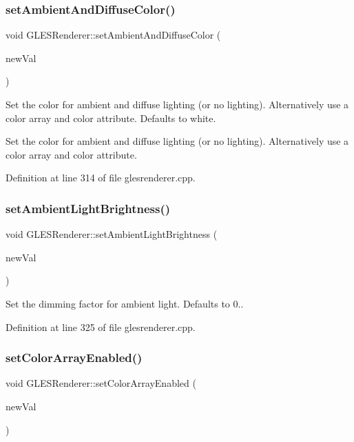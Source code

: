 \subsubsection{\texorpdfstring{setAmbientAndDiffuseColor()}{setAmbientAndDiffuseColor()}}
{\footnotesize\ttfamily void G\+L\+E\+S\+Renderer\+::set\+Ambient\+And\+Diffuse\+Color (\begin{DoxyParamCaption}\item[{const \mbox{\hyperlink{class_g_l_color_rgba}{G\+L\+Color\+Rgba}}}]{new\+Val }\end{DoxyParamCaption})}

Set the color for ambient and diffuse lighting (or no lighting). Alternatively use a color array and color attribute. Defaults to white.

Set the color for ambient and diffuse lighting (or no lighting). Alternatively use a color array and color attribute. 

Definition at line 314 of file glesrenderer.\+cpp.

\mbox{\label{class_g_l_e_s_renderer_a0173737627f25d5a0586a57569c211d2}} 
\subsubsection{\texorpdfstring{setAmbientLightBrightness()}{setAmbientLightBrightness()}}
{\footnotesize\ttfamily void G\+L\+E\+S\+Renderer\+::set\+Ambient\+Light\+Brightness (\begin{DoxyParamCaption}\item[{float}]{new\+Val }\end{DoxyParamCaption})}

Set the dimming factor for ambient light. Defaults to 0.. 

Definition at line 325 of file glesrenderer.\+cpp.

\mbox{\label{class_g_l_e_s_renderer_a990ae5bda053d007a710e7e9956facf1}} 
\subsubsection{\texorpdfstring{setColorArrayEnabled()}{setColorArrayEnabled()}}
{\footnotesize\ttfamily void G\+L\+E\+S\+Renderer\+::set\+Color\+Array\+Enabled (\begin{DoxyParamCaption}\item[{bool}]{new\+Val }\end{DoxyParamCaption})}

